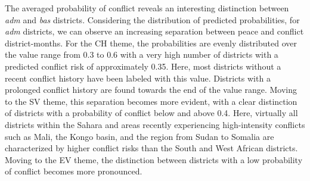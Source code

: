 \documentclass[a4paper,11pt]{article}
\begin{document}
The averaged probability of conflict reveals an interesting distinction between
\emph{adm} and \emph{bas} districts. Considering the distribution of predicted probabilities,
for \emph{adm} districts, we can observe an increasing separation between peace and
conflict district-months. For the CH theme, the probabilities are evenly distributed over
the value range from 0.3 to 0.6 with a very high number of districts with a predicted
conflict risk of approximately 0.35. Here, most districts without a recent conflict
history have been labeled with this value. Districts with a prolonged conflict history
are found towards the end of the value range. Moving to the SV theme, this separation
becomes more evident, with a clear distinction of districts with a probability of conflict
below and above 0.4. Here, virtually all districts within the Sahara and
areas recently experiencing high-intensity conflicts such as Mali, the Kongo basin,
and the region from Sudan to Somalia are characterized by higher conflict risks
than the South and West African districts. Moving to the EV theme, the distinction
between districts with a low probability of conflict becomes more pronounced.
\end{document}
